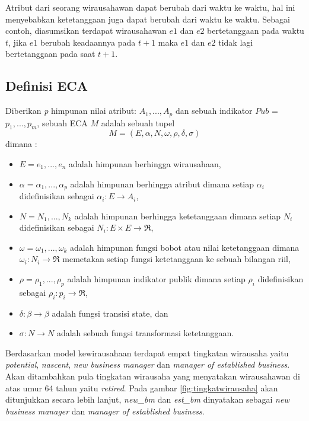 \begin{enumerate}
Atribut dari seorang wirausahawan dapat berubah dari waktu ke waktu, hal ini menyebabkan ketetanggaan juga dapat berubah dari waktu ke waktu. Sebagai contoh, diasumsikan terdapat wirausahawan $e1$ dan $e2$ bertetanggaan pada waktu $t$, jika $e1$ berubah keadaannya pada $t+1$ maka $e1$ dan $e2$ tidak lagi bertetanggaan pada saat $t+1$.

\subsection{Definisi ECA}
Diberikan \textit{p} himpunan nilai atribut: $A_{1}, ..., A_{p}$ dan sebuah indikator $Pub$ = ${p_{1}, ..., p_{m}}$, sebuah ECA $M$ adalah sebuah tupel
\begin{displaymath}
	M = (E, \alpha, N, \omega, \rho, \delta, \sigma)
\end{displaymath}
dimana :
\begin{itemize}
	\item $E = {e_{1}, ..., e_{n}}$ adalah himpunan berhingga wirausahaan,
	\item $\alpha = {\alpha_{1}, ..., \alpha_{p}}$ adalah himpunan berhingga atribut dimana setiap $\alpha_{i}$ didefinisikan sebagai $\alpha_{i} : E \rightarrow A_{i}$,
	\item $N = {N_{1}, ..., N_{k}}$ adalah himpunan berhingga ketetanggaan dimana setiap $N_{i}$ didefinisikan sebagai $N_{i}:E \times E \rightarrow \Re$,
	\item $\omega = {\omega_{1}, ..., \omega_{k}}$ adalah himpunan fungsi bobot atau nilai ketetanggaan dimana $\omega_{i} : N_{i} \rightarrow \Re$ memetakan setiap fungsi ketetanggaan ke sebuah bilangan riil,
	\item $\rho = {\rho_{1}, ..., \rho_{p}}$ adalah himpunan indikator publik dimana setiap $\rho_{i}$ didefinisikan sebagai $\rho_{i} : p_{i} \rightarrow \Re$,
	\item $\delta : \beta \rightarrow \beta$ adalah fungsi transisi state, dan
	\item $\sigma : N \rightarrow N$ adalah sebuah fungsi transformasi ketetanggaan.
\end{itemize}


Berdasarkan model kewirausahaan terdapat empat tingkatan wirausaha yaitu \textit{potential}, \textit{nascent}, \textit{new business manager} dan \textit{manager of established business}. Akan ditambahkan pula tingkatan wirausaha yang menyatakan wirausahawan di atas umur 64 tahun yaitu \textit{retired}. Pada gambar \ref{fig:tingkatwirausaha} akan ditunjukkan secara lebih lanjut, \textit{new\_bm} dan \textit{est\_bm} dinyatakan sebagai \textit{new business manager} dan \textit{manager of established business}.



\end{enumerate}

